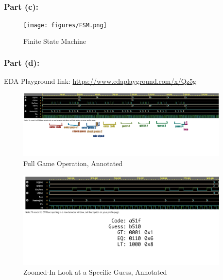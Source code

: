 \documentclass[10pt]{article}
\begin{document}
\subsubsection*{Part (c):}

\begin{figure} [H]
  \center
  \texttt{[image: figures/FSM.png]}
  \caption{Finite State Machine}
\end{figure}

\subsubsection*{Part (d):}

EDA Playground link: \url{https://www.edaplayground.com/x/Qz5g}

\begin{figure} [H]
  \center
  \includegraphics[width=0.95\textwidth]{figures/game_operation.png}
  \caption{Full Game Operation, Annotated}
\end{figure}

\begin{figure} [H]
  \center
  \includegraphics[width=0.95\textwidth]{figures/guess.png}
  \caption{Zoomed-In Look at a Specific Guess, Annotated}
\end{figure}
\end{document}

